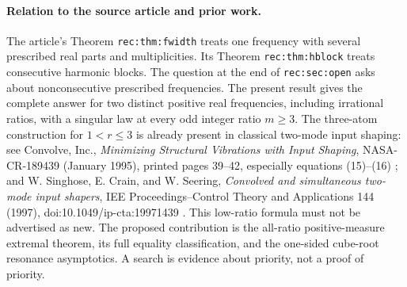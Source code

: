 \paragraph{Relation to the source article and prior work.}
The article's Theorem \texttt{rec:thm:fwidth} treats one frequency
with several prescribed real parts and multiplicities. Its Theorem
\texttt{rec:thm:hblock} treats consecutive harmonic blocks. The
question at the end of \texttt{rec:sec:open} asks about nonconsecutive
prescribed frequencies. The present result gives the complete answer
for two distinct positive real frequencies, including irrational ratios,
with a singular law at every odd integer ratio $m\ge3$.
The three-atom construction for $1<r\le3$ is already present in
classical two-mode input shaping: see Convolve, Inc.,
\emph{Minimizing Structural Vibrations with Input Shaping},
NASA-CR-189439 (January 1995), printed pages 39--42, especially
equations (15)--(16) \cite{NASA1995}; and W. Singhose, E. Crain, and W. Seering,
\emph{Convolved and simultaneous two-mode input shapers},
IEE Proceedings--Control Theory and Applications 144 (1997),
doi:10.1049/ip-cta:19971439 \cite{Shaping1997}. This low-ratio formula must not be
advertised as new. The proposed contribution is the all-ratio
positive-measure extremal theorem, its full equality classification,
and the one-sided cube-root resonance asymptotics. A search is
evidence about priority, not a proof of priority.
